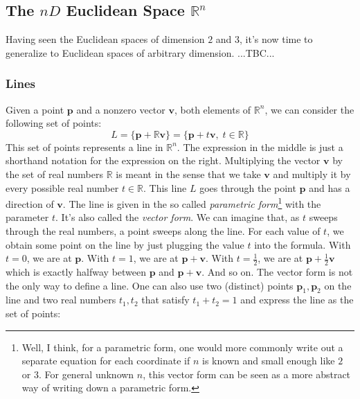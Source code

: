 \subsection{The $nD$ Euclidean Space $\mathbb{R}^n$}
Having seen the Euclidean spaces of dimension $2$ and $3$, it's now time to generalize to Euclidean spaces of arbitrary dimension. ...TBC...


\subsubsection{Lines}
Given a point $\mathbf{p}$ and a nonzero vector $\mathbf{v}$, both elements of $\mathbb{R}^n$, we can consider the following set of points:
\begin{equation}
 L 
 =
 \{\mathbf{p} + \mathbb{R} \mathbf{v} \} 
 = 
 \{ \mathbf{p} + t \mathbf{v}, \; t \in \mathbb{R} \}
\end{equation}
This set of points represents a line in $\mathbb{R}^n$. The expression in the middle is just a shorthand notation for the expression on the right. Multiplying the vector $\mathbf{v}$ by the set of real numbers $\mathbb{R}$ is meant in the sense that we take $\mathbf{v}$ and multiply it by every possible real number $t \in \mathbb{R}$. This line $L$ goes through the point $\mathbf{p}$ and has a direction of $\mathbf{v}$. The line is given in the so called \emph{parametric form}\footnote{Well, I think, for a parametric form, one would more commonly write out a separate equation for each coordinate if $n$ is known and small enough like $2$ or $3$. For general unknown $n$, this vector form can be seen as a more abstract way of writing down a parametric form.} with the parameter $t$. It's also called the \emph{vector form}. We can imagine that, as $t$ sweeps through the real numbers, a point sweeps along the line. For each value of $t$, we obtain some point on the line by just plugging the value $t$ into the formula. With $t=0$, we are at $\mathbf{p}$. With $t=1$, we are at $\mathbf{p + v}$. With $t=\frac{1}{2}$, we are at $\mathbf{p} + \frac{1}{2} \mathbf{v}$ which is exactly halfway between $\mathbf{p}$ and $\mathbf{p + v}$. And so on. The vector form is not the only way to define a line. One can also use two (distinct) points $\mathbf{p}_1,\mathbf{p}_2$ on the line and two real numbers $t_1, t_2$ that satisfy $t_1 + t_2 = 1$ and express the line as the set of points:
